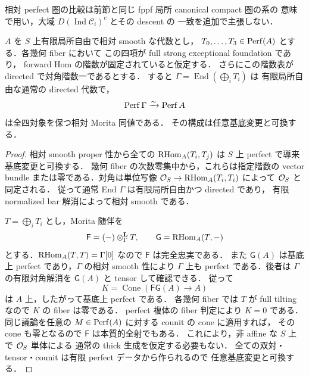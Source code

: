 相対 perfect 圏の比較は前節と同じ fppf 局所 canonical compact 圏の系の
意味で用い，大域 $D(\operatorname{Ind}\mathcal C_i)^c$ とその descent の
一致を追加で主張しない．

\begin{lemma}[有限directed模型における相対tiltingの検出]
\label{lem:qa-relative-avatar-perfect-tilting-detection}
$A$ を $S$ 上有限局所自由で相対 smooth な代数とし，
$T_0,\ldots,T_3\in\operatorname{Perf}(A)$ とする．各幾何 fiber において
この四項が full strong exceptional foundation であり，
forward Hom の階数が固定されていると仮定する．
さらにこの階数表が directed で対角階数一であるとする．
すると $\Gamma=\operatorname{End}(\bigoplus_iT_i)$ は
有限局所自由な通常の directed 代数で，
\[
 \operatorname{Perf}\Gamma\xrightarrow{\sim}\operatorname{Perf} A
\]
は全四対象を保つ相対 Morita 同値である．
その構成は任意基底変更と可換する．
\end{lemma}
\begin{proof}
相対 smooth proper 性から全ての $\operatorname{RHom}_A(T_i,T_j)$ は
$S$ 上 perfect で導来基底変更と可換する．
幾何 fiber の次数零集中から，これらは指定階数の vector bundle
または零である．対角は単位写像
$\mathcal O_S\to\operatorname{RHom}_A(T_i,T_i)$ によって $\mathcal O_S$ と同定される．
従って通常 End $\Gamma$ は有限局所自由かつ directed であり，
有限 normalized bar 解消によって相対 smooth である．

$T=\bigoplus_iT_i$ とし，Morita 随伴を
\[
 \mathsf F=(-)\otimes_\Gamma^{\mathbf L}T,
 \qquad\mathsf G=\operatorname{RHom}_A(T,-)
\]
とする．$\operatorname{RHom}_A(T,T)=\Gamma[0]$ なので $\mathsf F$ は完全忠実である．
また $\mathsf G(A)$ は基底上 perfect であり，$\Gamma$ の相対 smooth 性により
$\Gamma$ 上も perfect である．後者は $\Gamma$ の有限対角解消を
$\mathsf G(A)$ と tensor して確認できる．
従って
\[
 K=\operatorname{Cone}(\mathsf F\mathsf G(A)\to A)
\]
は $A$ 上，したがって基底上 perfect である．
各幾何 fiber では $T$ が full tilting なので $K$ の fiber は零である．
perfect 複体の fiber 判定により $K=0$ である．
同じ議論を任意の $M\in\operatorname{Perf}(A)$ に対する counit の cone に適用すれば，
その cone も零となるので $\mathsf F$ は本質的全射でもある．
これにより，非 affine な $S$ 上で $\mathcal O_S$ 単体による
通常の thick 生成を仮定する必要もない．
全ての双対・tensor・counit は有限 perfect データから作られるので
任意基底変更と可換する．
\end{proof}

